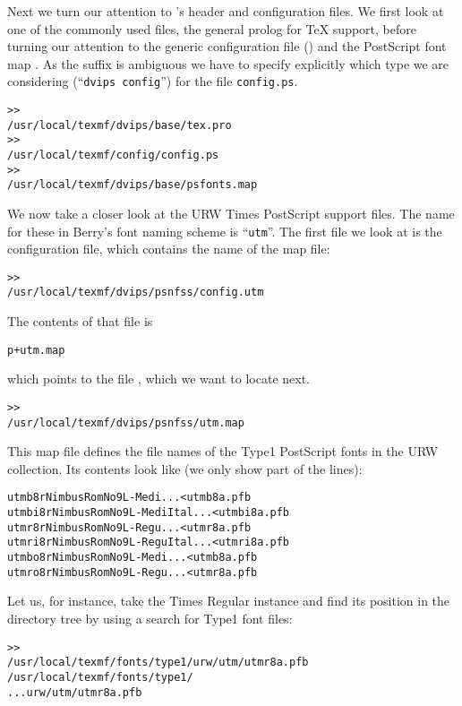 \documentclass{article}
\begin{document}
\begin{multicols}{2}
Next we turn our attention to 's header and configuration
files.  We first look at one of the commonly used files, the general
prolog  for \TeX{} support, before turning our attention
to the generic configuration file () and the
PostScript font map .  As the  suffix is
ambiguous we have to specify explicitly which type we are considering
(``\texttt{dvips config}'') for the file \texttt{config.ps}.
\begin{alltt}
>> 
   /usr/local/texmf/dvips/base/tex.pro
>> 
   /usr/local/texmf/config/config.ps
>> 
   /usr/local/texmf/dvips/base/psfonts.map
\end{alltt}

We now take a closer look at the URW Times PostScript support files.
The name for these in Berry's font naming scheme is ``\texttt{utm}''.
The first file we look at is the configuration file, which contains
the name of the map file:
\begin{alltt}
>> 
/usr/local/texmf/dvips/psnfss/config.utm
\end{alltt}
The contents of that file is
\begin{alltt}
  p +utm.map
\end{alltt}
which points to the file , which we want to
locate next.
\begin{alltt}
>> 
   /usr/local/texmf/dvips/psnfss/utm.map
\end{alltt}
This map file defines the file names of the Type1 PostScript fonts in
the URW collection.  Its contents look like (we only show part of the
lines):
\begin{alltt}
  utmb8r  NimbusRomNo9L-Medi    ... <utmb8a.pfb
  utmbi8r NimbusRomNo9L-MediItal... <utmbi8a.pfb
  utmr8r  NimbusRomNo9L-Regu    ... <utmr8a.pfb
  utmri8r NimbusRomNo9L-ReguItal... <utmri8a.pfb
  utmbo8r NimbusRomNo9L-Medi    ... <utmb8a.pfb
  utmro8r NimbusRomNo9L-Regu    ... <utmr8a.pfb
\end{alltt}
Let us, for instance, take the Times Regular instance
 and find its position in the  directory
tree by using a search for Type1 font files:
\begin{alltt}
>> 
\ifSingleColumn   /usr/local/texmf/fonts/type1/urw/utm/utmr8a.pfb
\else   /usr/local/texmf/fonts/type1/
...                       urw/utm/utmr8a.pfb
\fi\end{alltt}


\end{multicols}
\end{document}
